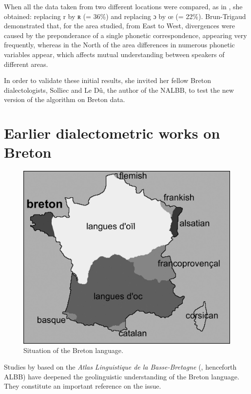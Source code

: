 \documentclass[output=paper]{LSP/langsci}
\begin{document}
When all the data taken from two different locations were compared, as in , she obtained: replacing {r} by {ʀ} (= 36\%) and replacing {ɔ} by {œ} (= 22\%). 
Brun-Trigaud demonstrated that, for the area studied, from East to West, divergences were caused by the preponderance of a single phonetic correspondence, appearing very frequently, whereas in the North of the area differences in numerous phonetic variables appear, which affects mutual understanding between speakers of different areas.

In order to validate these initial results, she invited her fellow Breton dialectologists, Solliec and Le Dû, the author of the NALBB, to test the new version of the algorithm on Breton data.

\section[Earlier dialectometric works on Breton ]{Earlier dialectometric works on Breton }
  
\begin{figure}
\includegraphics[width=\textwidth]{illustrations/brun_etal_fig1}
\caption{Situation of the Breton language.}
\label{fig:1}
\end{figure}

Studies by \citet{falchun_perspectives_1981} based on the \textit{Atlas Linguistique de la Basse-Bretagne} (\citealt{le_roux_atlas_1924}, henceforth ALBB) have deepened the geolinguistic understanding of the Breton language. They constitute an important reference on the issue. 
\end{document}
